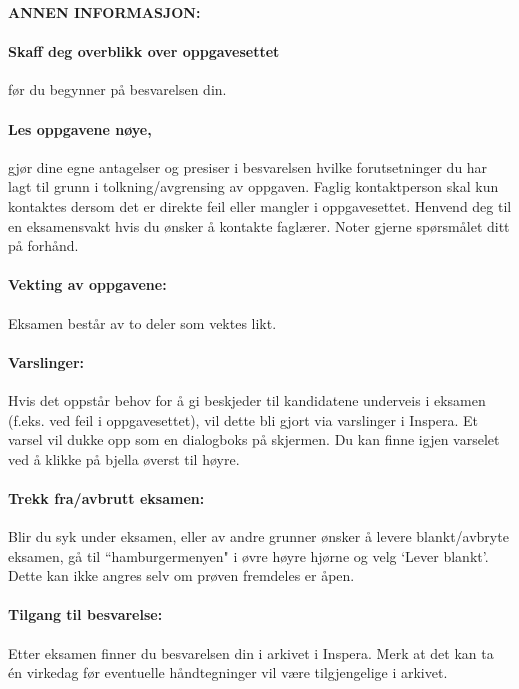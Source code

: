 \documentclass[a4paper,12pt,fleqn]{article}
\begin{document}
\vspace{.5cm}

\begin{center}
	\textbf{ANNEN INFORMASJON:}
\end{center}

\paragraph{\textbf{Skaff deg overblikk over oppgavesettet}} før du begynner på
besvarelsen din.

\paragraph{\textbf{Les oppgavene nøye,}} gjør dine egne antagelser og presiser i
besvarelsen hvilke forutsetninger du har lagt til grunn i tolkning/avgrensing av
oppgaven. Faglig kontaktperson skal kun kontaktes dersom det er direkte feil
eller mangler i oppgavesettet. Henvend deg til en eksamensvakt hvis du ønsker å
kontakte faglærer. Noter gjerne spørsmålet ditt på forhånd.

\paragraph{\textbf{Vekting av oppgavene:}} Eksamen består av to deler som vektes
likt.

\paragraph{\textbf{Varslinger:}} Hvis det oppstår behov for å gi beskjeder til
kandidatene underveis i eksamen (f.eks. ved feil i oppgavesettet), vil dette bli
gjort via varslinger i Inspera. Et varsel vil dukke opp som en dialogboks på
skjermen. Du kan finne igjen varselet ved å klikke på bjella øverst til høyre.

\paragraph{\textbf{Trekk fra/avbrutt eksamen:}} Blir du syk under eksamen, eller
av andre grunner ønsker å levere blankt/avbryte eksamen, gå til
``hamburgermenyen" i øvre høyre hjørne og velg `Lever blankt'. Dette kan ikke
angres selv om prøven fremdeles er åpen.

\paragraph{\textbf{Tilgang til besvarelse:}}  Etter eksamen finner du
besvarelsen din i arkivet i Inspera. Merk at det kan ta én virkedag før
eventuelle håndtegninger vil være tilgjengelige i arkivet.
\end{document}

